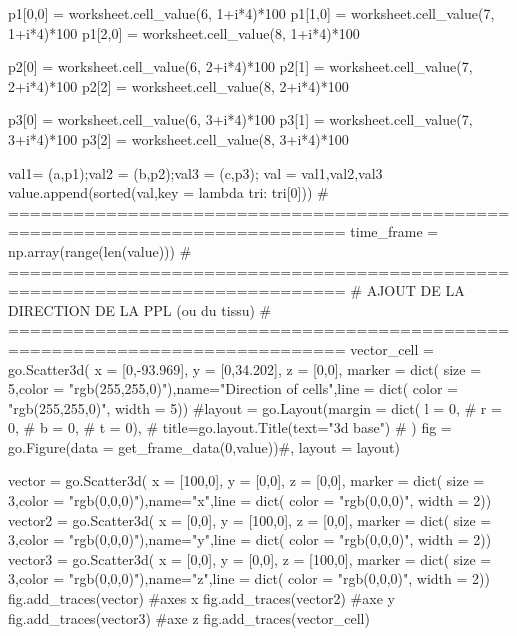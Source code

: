 \begin{customFrame}
    p1[0,0] = worksheet.cell_value(6, 1+i*4)*100   
    p1[1,0] = worksheet.cell_value(7, 1+i*4)*100   
    p1[2,0] = worksheet.cell_value(8, 1+i*4)*100 
      
    p2[0] = worksheet.cell_value(6, 2+i*4)*100   
    p2[1] = worksheet.cell_value(7, 2+i*4)*100   
    p2[2] = worksheet.cell_value(8, 2+i*4)*100 
       
    p3[0] = worksheet.cell_value(6, 3+i*4)*100   
    p3[1] = worksheet.cell_value(7, 3+i*4)*100
    p3[2] = worksheet.cell_value(8, 3+i*4)*100
    
    val1= (a,p1);val2 = (b,p2);val3 = (c,p3);
    val = val1,val2,val3
    value.append(sorted(val,key = lambda tri: tri[0]))
# =============================================================================    
time_frame = np.array(range(len(value)))  
# =============================================================================
# AJOUT DE LA DIRECTION DE LA PPL (ou du tissu)
# =============================================================================
vector_cell = go.Scatter3d( x = [0,-93.969], y = [0,34.202], z = [0,0],  marker = dict( size = 5,color = "rgb(255,255,0)"),name="Direction of cells",line = dict( color = "rgb(255,255,0)", width = 5))   
#layout = go.Layout(margin = dict( l = 0,
#                                  r = 0,
#                                  b = 0,
#                                  t = 0),
#                       title=go.layout.Title(text="3d base")
#                      )
fig = go.Figure(data = get_frame_data(0,value))#, layout = layout)

vector = go.Scatter3d( x = [100,0], y = [0,0], z = [0,0],  marker = dict( size = 3,color = "rgb(0,0,0)"),name="x",line = dict( color = "rgb(0,0,0)", width = 2)) 
vector2 = go.Scatter3d( x = [0,0], y = [100,0], z = [0,0],  marker = dict( size = 3,color = "rgb(0,0,0)"),name="y",line = dict( color = "rgb(0,0,0)", width = 2)) 
vector3 = go.Scatter3d( x = [0,0], y = [0,0], z = [100,0],  marker = dict( size = 3,color = "rgb(0,0,0)"),name="z",line = dict( color = "rgb(0,0,0)", width = 2)) 
fig.add_traces(vector) #axes x
fig.add_traces(vector2) #axe y
fig.add_traces(vector3) #axe z
fig.add_traces(vector_cell)


\end{customFrame}
